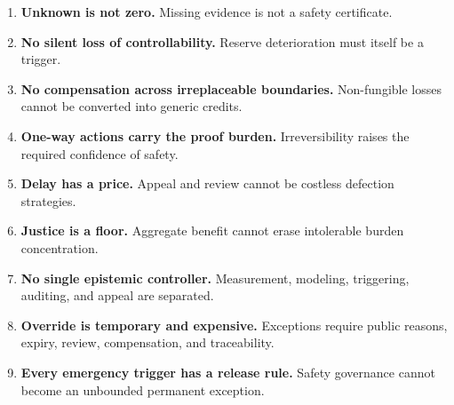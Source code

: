 \documentclass[11pt,a4paper]{article}
\numberwithin{equation}{section}
\theoremstyle{definition}
\theoremstyle{plain}
\theoremstyle{remark}
\begin{document}
\begin{enumerate}
  \item \textbf{Unknown is not zero.} Missing evidence is not a safety certificate.
  \item \textbf{No silent loss of controllability.} Reserve deterioration must itself be a trigger.
  \item \textbf{No compensation across irreplaceable boundaries.} Non-fungible losses cannot be converted into generic credits.
  \item \textbf{One-way actions carry the proof burden.} Irreversibility raises the required confidence of safety.
  \item \textbf{Delay has a price.} Appeal and review cannot be costless defection strategies.
  \item \textbf{Justice is a floor.} Aggregate benefit cannot erase intolerable burden concentration.
  \item \textbf{No single epistemic controller.} Measurement, modeling, triggering, auditing, and appeal are separated.
  \item \textbf{Override is temporary and expensive.} Exceptions require public reasons, expiry, review, compensation, and traceability.
  \item \textbf{Every emergency trigger has a release rule.} Safety governance cannot become an unbounded permanent exception.
\end{enumerate}

\printbibliography[heading=bibintoc,title={References}]
\end{document}
